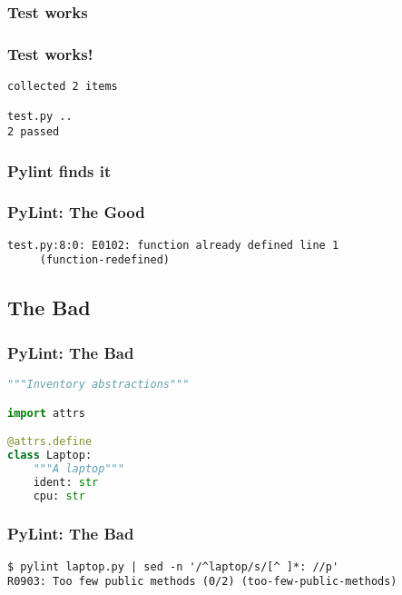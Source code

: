 \hypertarget{test-works}{%
\subsubsection{Test works}\label{test-works}}

\begin{frame}[fragile]
\frametitle{Test works!}

\begin{lstlisting}
collected 2 items                                                                         

test.py .. 
2 passed 
\end{lstlisting}

\end{frame}

\hypertarget{pylint-finds-it}{%
\subsubsection{Pylint finds it}\label{pylint-finds-it}}

\begin{frame}[fragile]
\frametitle{PyLint: The Good}

\begin{lstlisting}
test.py:8:0: E0102: function already defined line 1
     (function-redefined)
\end{lstlisting}

\end{frame}

\hypertarget{the-bad}{%
\subsection{The Bad}\label{the-bad}}

\begin{frame}[fragile]
\frametitle{PyLint: The Bad}

\begin{lstlisting}[language=Python]
"""Inventory abstractions"""

import attrs

@attrs.define
class Laptop:
    """A laptop"""
    ident: str
    cpu: str
\end{lstlisting}

\end{frame}

\begin{frame}[fragile]
\frametitle{PyLint: The Bad}

\begin{lstlisting}
$ pylint laptop.py | sed -n '/^laptop/s/[^ ]*: //p'
R0903: Too few public methods (0/2) (too-few-public-methods)
\end{lstlisting}

\end{frame}

